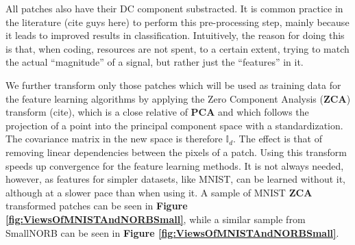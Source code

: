 \documentclass[12pt,a4paper,oneside,english]{UPBThesis}
\begin{document}
All patches also have their DC component substracted. It is common practice in the literature (cite guys here) to perform this pre-processing step, mainly because it leads to improved results in classification. Intuitively, the reason for doing this is that, when coding, resources are not spent, to a certain extent, trying to match the actual ``magnitude'' of a signal, but rather just the ``features'' in it.

We further transform only those patches which will be used as training data for the feature learning algorithms by applying the Zero Component Analysis (\textbf{ZCA}) transform (cite), which is a close relative of \textbf{PCA} and which follows the projection of a point into the principal component space with a standardization. The covariance matrix in the new space is therefore $\mathbb{I}_d$. The effect is that of removing linear dependencies between the pixels of a patch. Using this transform speeds up convergence for the feature learning methods. It is not always needed, however, as features for simpler datasets, like MNIST, can be learned without it, although at a slower pace than when using it. A sample of MNIST \textbf{ZCA} transformed patches can be seen in \textbf{Figure \ref{fig:ViewsOfMNISTAndNORBSmall}}, while a similar sample from SmallNORB can be seen in \textbf{Figure \ref{fig:ViewsOfMNISTAndNORBSmall}}.
\end{document}
